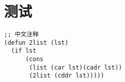 \section{测试}

\begin{lstlisting}
;; 中文注释
(defun 2list (lst)
  (if lst
      (cons
       (list (car lst)(cadr lst))
       (2list (cddr lst)))))
\end{lstlisting}

